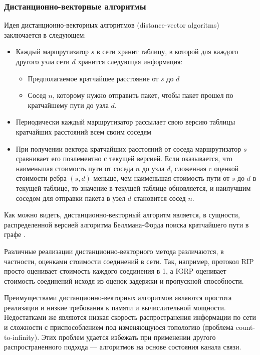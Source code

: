 \documentclass[specification,annotation,times]{itmo-student-thesis}
\theoremstyle{definition}
\begin{document}
\subsubsection{Дистанционно-векторные алгоритмы}

Идея дистанционно-векторных алгоритмов (distance-vector algoritms) заключается в
следующем:

\begin{itemize}
\item Каждый маршрутизатор $s$ в сети хранит таблицу, в которой для каждого другого узла
  сети $d$ хранится следующая информация:
  \begin{itemize}
  \item Предполагаемое кратчайшее расстояние от $s$ до $d$
  \item Сосед $n$, которому нужно отправить пакет, чтобы пакет прошел по
    кратчайшему пути до узла $d$.
  \end{itemize}
\item Периодически каждый маршрутизатор рассылает свою версию таблицы кратчайших
  расстояний всем своим соседям
\item При получении вектора кратчайших расстояний от соседа маршрутизатор $s$
  сравнивает его поэлементно с текущей версией. Если оказывается, что наименьшая
  стоимость пути от соседа $n$ до узла $d$, сложенная c оценкой стоимости ребра
  $(s, d)$ меньше, чем наименьшая стоимость пути от $s$ до $d$ в текущей
  таблице, то значение в текущей таблице обновляется, и наилучшим соседом для
  отправки пакета в узел $d$ становится сосед $n$.
\end{itemize}

Как можно видеть, дистанционно-векторный алгоритм является, в сущности,
распределенной версией алгоритма Беллмана-Форда поиска кратчайшего пути в
графе \cite{bellman-ford}.

Различные реализации дистанционно-векторного метода различаются, в частности,
оценками стоимости соединений в сети. Так, например, протокол RIP \cite{rip-rfc} просто
оценивает стоимость каждого соединения в 1, а IGRP \cite{igrp-patent} оценивает
стоимость соединений исходя из оценок задержки и пропускной способности.

Преимуществами дистанционно-векторных алгоритмов являются простота реализации и
низкие требования к памяти и вычислительной мощности. Недостатками же являются
низкая скорость распространения информации по сети и сложности с приспособлением
под изменяющуюся топологию (проблема count-to-infinity). Этих проблем
удается избежать при применении другого распространенного подхода --- алгоритмов
на основе состояния канала связи. 
\end{document}
